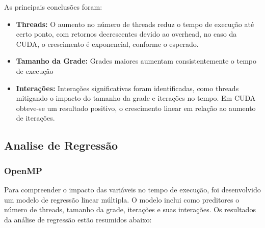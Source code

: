 As principais conclusões foram:

\begin{itemize}
    \item \textbf{Threads:} O aumento no número de threads reduz o tempo de execução até certo ponto, com retornos decrescentes devido ao overhead, no caso da CUDA, o crescimento é exponencial, conforme o esperado.
    \item \textbf{Tamanho da Grade:} Grades maiores aumentam consistentemente o tempo de execução
    \item \textbf{Interações:} Interações significativas foram identificadas, como threads mitigando o impacto do tamanho da grade e iterações no tempo. Em CUDA obteve-se um resultado positivo, o crescimento linear em relação ao aumento de iterações.
\end{itemize}

\subsection{Analise de Regressão}
\subsubsection{OpenMP}
Para compreender o impacto das variáveis no tempo de execução, foi desenvolvido um modelo de regressão linear múltipla. O modelo inclui como preditores o número de threads, tamanho da grade, iterações e suas interações. Os resultados da análise de regressão estão resumidos abaixo:

